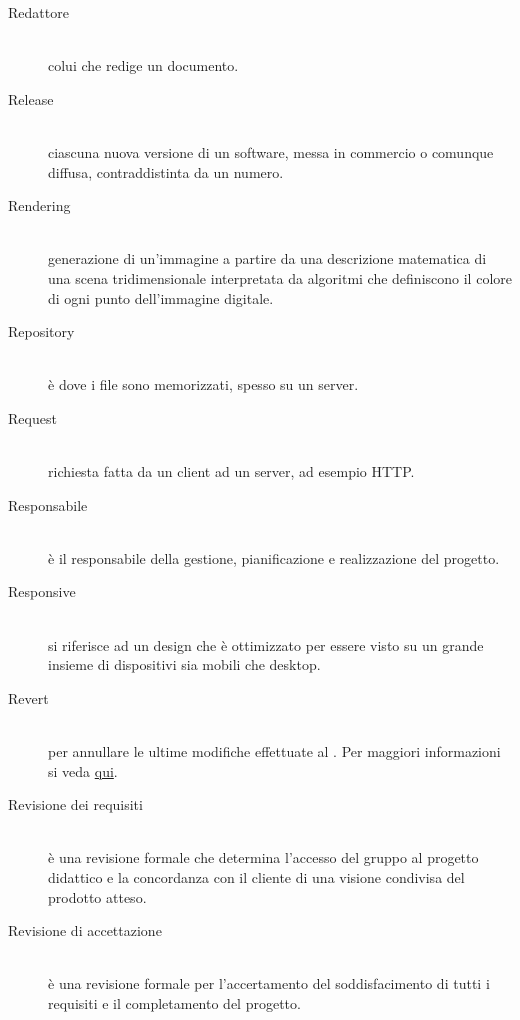 \documentclass[12pt,a4paper]{article}
\begin{document}
\begin{description}
\item[Redattore] 
\hfill\\colui che redige un documento.

\item[Release] 
\hfill\\ciascuna nuova versione di un software, messa in commercio o comunque diffusa, contraddistinta da un numero.

\item[Rendering] 
\hfill\\generazione di un'immagine a partire da una descrizione matematica di una scena tridimensionale interpretata da algoritmi che definiscono il colore di ogni punto dell'immagine digitale.

\item[Repository] 
\hfill\\è dove i file sono memorizzati, spesso su un server.

\item[Request] 
\hfill\\richiesta fatta da un client ad un server, ad esempio HTTP.

\item[Responsabile] 
\hfill\\è il responsabile della gestione, pianificazione e realizzazione del progetto.

\item[Responsive] 
\hfill\\si riferisce ad un design che è ottimizzato per essere visto su un grande insieme di dispositivi sia mobili che desktop.

\item[Revert] 
\hfill\\per annullare le ultime modifiche effettuate al . Per maggiori informazioni si veda \href{https://git-scm.com/docs/}{qui}.

\item[Revisione dei requisiti] 
\hfill\\è una revisione formale che determina l'accesso del gruppo al progetto didattico e la concordanza con il cliente di una visione condivisa del prodotto atteso.

\item[Revisione di accettazione] 
\hfill\\è una revisione formale per l'accertamento del soddisfacimento di tutti i requisiti e il completamento del progetto.


\end{description}
\end{document}
